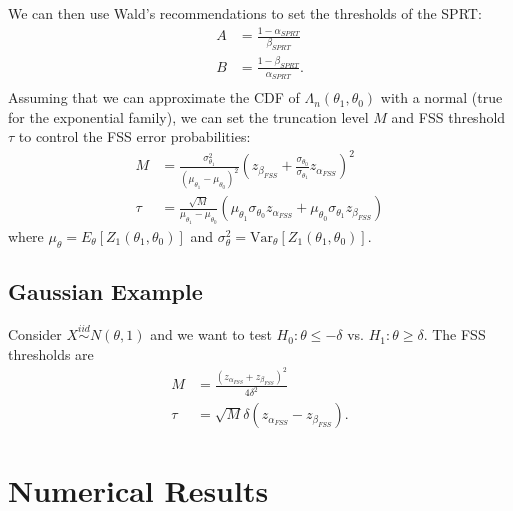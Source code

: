 \documentclass[11pt]{article}
\begin{document}
We can then use Wald's recommendations to set the thresholds of the SPRT:
\begin{equation}
\begin{split}
A &= \frac{1 - \alpha_{SPRT}}{\beta_{SPRT}} \\
B &= \frac{1 - \beta_{SPRT}}{\alpha_{SPRT}}. \\
\end{split}
\end{equation}
Assuming that we can approximate the CDF of $\Lambda_n(\theta_1, \theta_0)$ with a normal (true for the exponential family), we can set the truncation level $M$ and FSS threshold $\tau$ to control the FSS error probabilities:
\begin{equation}
\begin{split}
M &= \frac{\sigma_{\theta_1}^2}{(\mu_{\theta_1} - \mu_{\theta_0})^2} \left(z_{\beta_{FSS}} + \frac{\sigma_{\theta_0}}{\sigma_{\theta_1}}z_{\alpha_{FSS}}\right)^2 \\
\tau &= \frac{\sqrt{M}}{\mu_{\theta_1} - \mu_{\theta_0}} \left(\mu_{\theta_1} \sigma_{\theta_0} z_{\alpha_{FSS}} + \mu_{\theta_0} \sigma_{\theta_1} z_{\beta_{FSS}}\right)
\end{split}
\end{equation}
where $\mu_{\theta} = E_{\theta}\left[Z_1(\theta_1, \theta_0)\right]$ and $\sigma^2_{\theta} = \text{Var}_{\theta}\left[Z_1(\theta_1, \theta_0)\right]$.

\subsection{Gaussian Example}
Consider $X \overset{iid}\sim N(\theta, 1)$ and we want to test $H_0 : \theta \leq -\delta$ vs. $H_1 : \theta \geq \delta$. The FSS thresholds are
\begin{equation}
\begin{split}
M &= \frac{(z_{\alpha_{FSS}} + z_{\beta_{FSS}})^2}{4 \delta^2} \\
\tau &= \sqrt{M} \delta (z_{\alpha_{FSS}} - z_{\beta_{FSS}}).
\end{split}
\end{equation}

\section{Numerical Results}
\end{document}
